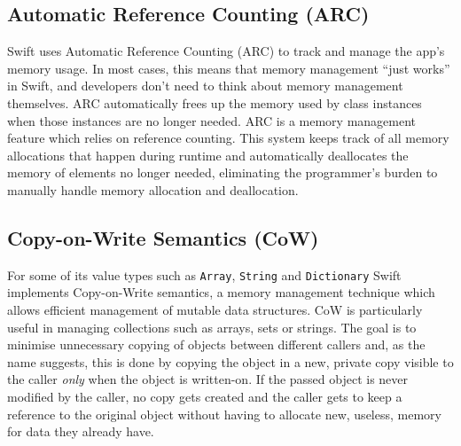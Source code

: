 \subsection{Automatic Reference Counting (ARC)}
Swift uses Automatic Reference Counting (ARC) to track and manage the app’s memory usage. In most cases, this means that memory management “just works” in Swift, and developers don’t need to think about memory management themselves. ARC automatically frees up the memory used by class instances when those instances are no longer needed.\cite{swift-docs}
ARC is a memory management feature which relies on reference counting. This system keeps track of all memory allocations that happen during runtime and automatically deallocates the memory of elements no longer needed, eliminating the programmer's burden to manually handle memory allocation and deallocation.


\subsection{Copy-on-Write Semantics (CoW)}
For some of its value types such as \lstinline{Array}, \lstinline{String} and \lstinline{Dictionary} Swift implements Copy-on-Write semantics, a memory management technique which allows efficient management of mutable data structures. CoW is particularly useful in managing collections such as arrays, sets or strings. The goal is to minimise unnecessary copying of objects between different callers and, as the name suggests, this is done by copying the object in a new, private copy visible to the caller \textit{only} when the object is written-on. If the passed object is never modified by the caller, no copy gets created and the caller gets to keep a reference to the original object without having to allocate new, useless, memory for data they already have. \cite{protocol-oriented}

